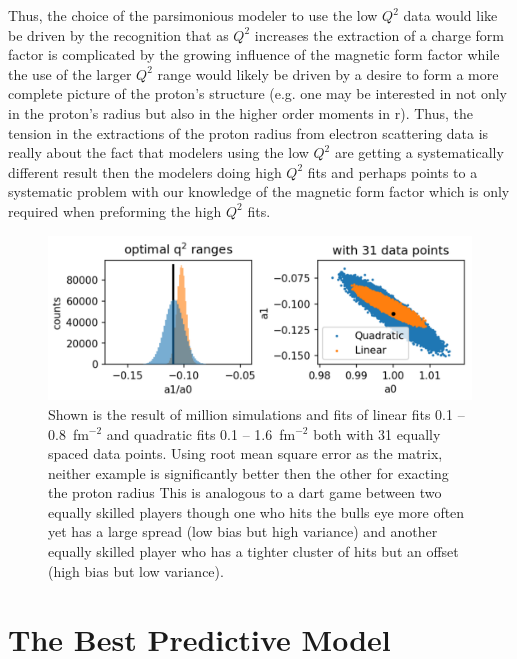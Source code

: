 \documentclass[10pt,aps,prc,twocolumn]{revtex4-1}
\begin{document}
Thus, the choice of the parsimonious modeler to use the low $Q^2$ data would like be 
driven by the recognition that as $Q^2$ increases
the extraction of a charge form factor is complicated by the growing influence of the magnetic 
form factor while the use of the larger $Q^2$
range would likely be driven by a desire to form a more complete picture of the proton's structure 
(e.g. one may be interested in not only in the proton's radius but also in the higher order moments in r).
Thus, the tension in the extractions of the proton radius from electron scattering data is really 
about the fact that modelers using the low $Q^2$ are getting a systematically different result then
the modelers doing high $Q^2$ fits and perhaps points to a systematic problem with our knowledge
of the magnetic form factor which is only required when preforming the high $Q^2$ fits.


\begin{figure}
\label{zoptimized}
\includegraphics[width=\columnwidth]{Figure/zoptimized.png}
\caption{Shown is the result of million simulations and fits of linear fits  0.1 -- 0.8~fm$^{-2}$ 
and quadratic fits 0.1 -- 1.6~fm$^{-2}$ both with 31 equally spaced data points.    Using root mean
square error as the matrix, neither example is significantly better then the other for exacting the proton
radius   This is analogous to a dart game between two equally skilled players though one who hits the bulls eye more 
often yet has a large spread (low bias but high variance) and another equally skilled player who has a tighter cluster of hits
but an offset (high bias but low variance).}
\end{figure}


\section{The Best Predictive Model}
\end{document}
